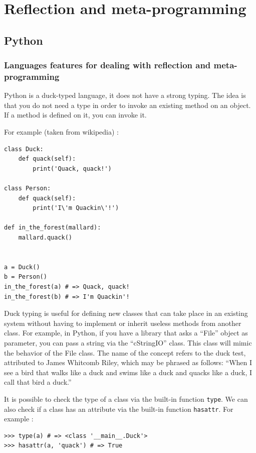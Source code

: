 \documentclass[a4paper,10pt]{article}
\begin{document}
\section{Reflection and meta-programming}

\subsection{Python}
\setpy{}
\subsubsection{Languages features for dealing with reflection and meta-programming}
\setpy{}
Python is a duck-typed language, it does not have a strong typing.
The idea is that you do not need a type in order to invoke an existing method on an object.
If a method is defined on it, you can invoke it.

For example (taken from wikipedia) :

\begin{lstlisting}
class Duck:
    def quack(self):
        print('Quack, quack!')

class Person:
    def quack(self):
        print('I\'m Quackin\'!')

def in_the_forest(mallard):
    mallard.quack()


a = Duck()
b = Person()
in_the_forest(a) # => Quack, quack!
in_the_forest(b) # => I'm Quackin'!
\end{lstlisting}

Duck typing is useful for defining new classes that can take place in an existing system without having to implement or inherit useless methods from another class. For example, in Python, if you have a library that asks a “File” object as parameter, you can pass a string via the  “cStringIO” class. This class will mimic the behavior of the File class. The name of the concept refers to the duck test, attributed to James Whitcomb Riley, which may be phrased as follows: “When I see a bird that walks like a duck and swims like a duck and quacks like a duck, I call that bird a duck.” \cite{ wiki:duck}

It is possible to check the type of a class via the built-in function \lstinline|type|.
We can also check if a class has an attribute via the built-in function \lstinline|hasattr|.
For example :

\begin{lstlisting}
>>> type(a) # => <class '__main__.Duck'>
>>> hasattr(a, 'quack') # => True
\end{lstlisting}
\end{document}
